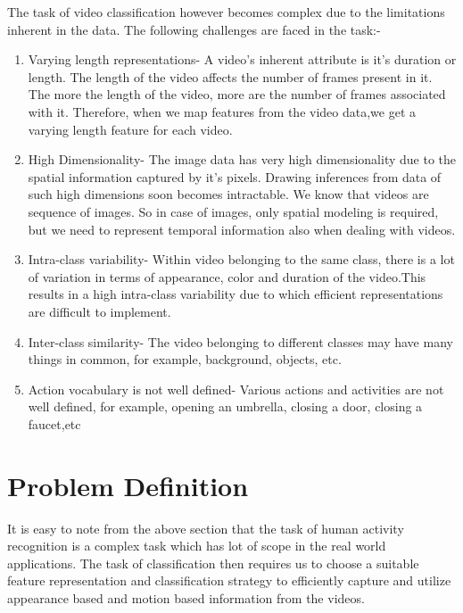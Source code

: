 The task of video classification however becomes complex due to the limitations inherent in the data. The following challenges are faced in the task:-
\begin{enumerate}
\item Varying length representations-
A video's inherent attribute is it's duration or length. The length of the video
affects the number of frames present in it. The more the length of the video, more are the number of frames associated with it. Therefore, when we map features from the video data,we get a varying length feature for each video.

\item High Dimensionality-
The image data has very high dimensionality due to the spatial information
captured by it's pixels. Drawing inferences from data of such high dimensions
soon becomes intractable. We know that videos are sequence of images. So
in case of images, only spatial modeling is required, but we need to represent
temporal information also when dealing with videos.

\item Intra-class variability-
Within video belonging to the same class, there is a lot of variation in terms
of appearance, color and duration of the video.This results in a high intra-class
variability due to which efficient representations are difficult to implement.

\item Inter-class similarity-
The video belonging to different classes may have many things in common, for
example, background, objects, etc.

\item Action vocabulary is not well defined-
Various actions and activities are not well defined, for example, opening an umbrella, closing a door, closing a faucet,etc

\end{enumerate}

\section{Problem Definition}
It is easy to note from the above section that the task of human activity recognition is a complex task which has lot of scope in the real world applications. The task of classification then requires us to choose a suitable feature representation and classification strategy to efficiently capture and utilize appearance based and motion based information from the videos.\\


